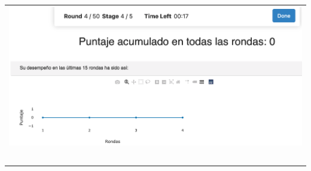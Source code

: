 \documentclass{standalone}
\begin{document}
\begin{tabular}{c}
\includegraphics[width=.45\linewidth]{retro-sin}\\
\\
\\
\\
\\
\\
\end{tabular}
\end{document}
